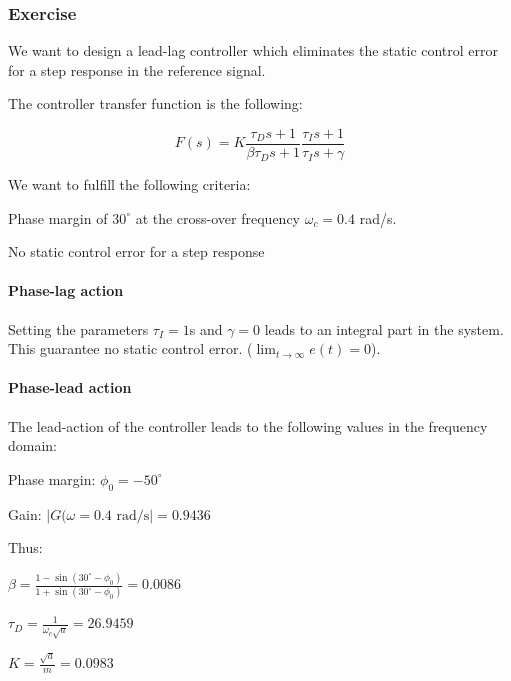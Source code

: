 \subsubsection{Exercise}
\label{exo411}

We want to design a lead-lag controller which eliminates the static control error for a step response in the reference signal.

The controller transfer function is the following:

$$ F(s) = K \frac{\tau_D s + 1}{\beta \tau_D s + 1} \frac{\tau_I s + 1}{\tau_I s + \gamma}$$

We want to fulfill the following criteria:
\begin{shortitemize}
 \item Phase margin of $30^{\circ}$ at the cross-over frequency $\omega_c = 0.4$ rad/s.
 \item No static control error for a step response 
\end{shortitemize}

\paragraph{Phase-lag action}
Setting the parameters $ \tau_I = 1$s and $\gamma = 0$ leads to an integral part in the system. 
This guarantee no static control error. ($\lim_{t\rightarrow\infty} e(t) = 0$).

\paragraph{Phase-lead action}

The lead-action of the controller leads to the following values in the frequency domain:
\begin{shortitemize}
    \item Phase margin: $\phi_0 = -50^{\circ}$
    \item Gain: $|G(\omega = 0.4\text{ rad/s}| = 0.9436$ 
\end{shortitemize}

Thus:

\begin{shortitemize}
    \item $\beta = \frac{1 - \sin(30^{\circ}-\phi_0)}{1 + \sin(30^{\circ} - \phi_0)} = 0.0086$
    \item $\tau_D = \frac{1}{\omega_c \sqrt{a}} = 26.9459$
    \item $K = \frac{\sqrt{a}}{m} = 0.0983$
\end{shortitemize}

